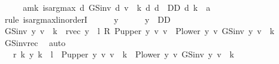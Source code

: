 \begin{isabellebody}
%
\isadelimproof
%
\endisadelimproof
%
\isatagproof
{}\isamarkupfalse%
\ {\isacharminus}{\kern0pt}\isanewline
\ \ \isamarkupfalse%
\ am{\isacharunderscore}{\kern0pt}k{\isacharcolon}{\kern0pt}\ {\isachardoublequoteopen}is{\isacharunderscore}{\kern0pt}arg{\isacharunderscore}{\kern0pt}max\ {\isacharparenleft}{\kern0pt}{\isasymlambda}d{\isachardot}{\kern0pt}\ GS{\isacharunderscore}{\kern0pt}inv\ d\ v\ {\isachardollar}{\kern0pt}\ k{\isacharparenright}{\kern0pt}\ {\isacharparenleft}{\kern0pt}{\isasymlambda}d{\isachardot}{\kern0pt}\ d\ {\isasymin}\ D\isactrlsub D{\isacharparenright}{\kern0pt}\ {\isacharparenleft}{\kern0pt}d\ {\isacharparenleft}{\kern0pt}k\ {\isacharcolon}{\kern0pt}{\isacharequal}{\kern0pt}\ a{\isacharparenright}{\kern0pt}{\isacharparenright}{\kern0pt}{\isachardoublequoteclose}\isanewline
\ \ \isamarkupfalse%
\ {\isacharparenleft}{\kern0pt}rule\ is{\isacharunderscore}{\kern0pt}arg{\isacharunderscore}{\kern0pt}max{\isacharunderscore}{\kern0pt}linorderI{\isacharparenright}{\kern0pt}\isanewline
\ \ \ \ \isamarkupfalse%
\ y\isanewline
\ \ \ \ \isamarkupfalse%
\ {\isachardoublequoteopen}y\ {\isasymin}\ D\isactrlsub D{\isachardoublequoteclose}\isanewline
\ \ \ \ \isamarkupfalse%
\ {\isachardoublequoteopen}GS{\isacharunderscore}{\kern0pt}inv\ y\ v\ {\isachardollar}{\kern0pt}\ k\ {\isacharequal}{\kern0pt}\ {\isacharparenleft}{\kern0pt}r{\isacharunderscore}{\kern0pt}vec\ y\ {\isacharplus}{\kern0pt}\ l\ {\isacharasterisk}{\kern0pt}\isactrlsub R\ {\isacharparenleft}{\kern0pt}P{\isacharunderscore}{\kern0pt}upper\ y\ {\isacharasterisk}{\kern0pt}v\ v\ {\isacharplus}{\kern0pt}\ P{\isacharunderscore}{\kern0pt}lower\ y\ {\isacharasterisk}{\kern0pt}v\ {\isacharparenleft}{\kern0pt}GS{\isacharunderscore}{\kern0pt}inv\ y\ v{\isacharparenright}{\kern0pt}{\isacharparenright}{\kern0pt}{\isacharparenright}{\kern0pt}\ {\isachardollar}{\kern0pt}\ k{\isachardoublequoteclose}\isanewline
\ \ \ \ \ \ \isamarkupfalse%
\ GS{\isacharunderscore}{\kern0pt}inv{\isacharunderscore}{\kern0pt}rec\ \isamarkupfalse%
\ auto\isanewline
\ \ \ \ \isamarkupfalse%
\ \isamarkupfalse%
\ {\isachardoublequoteopen}{\isasymdots}\ {\isacharequal}{\kern0pt}\ r\ {\isacharparenleft}{\kern0pt}k{\isacharcomma}{\kern0pt}\ y\ k{\isacharparenright}{\kern0pt}\ {\isacharplus}{\kern0pt}\ l\ {\isacharasterisk}{\kern0pt}\ {\isacharparenleft}{\kern0pt}{\isacharparenleft}{\kern0pt}P{\isacharunderscore}{\kern0pt}upper\ y\ {\isacharasterisk}{\kern0pt}v\ v{\isacharparenright}{\kern0pt}\ {\isachardollar}{\kern0pt}\ k\ {\isacharplus}{\kern0pt}\ {\isacharparenleft}{\kern0pt}P{\isacharunderscore}{\kern0pt}lower\ y\ {\isacharasterisk}{\kern0pt}v\ GS{\isacharunderscore}{\kern0pt}inv\ y\ v{\isacharparenright}{\kern0pt}\ {\isachardollar}{\kern0pt}\ k{\isacharparenright}{\kern0pt}{\isachardoublequoteclose}\isanewline

\end{isabellebody}

